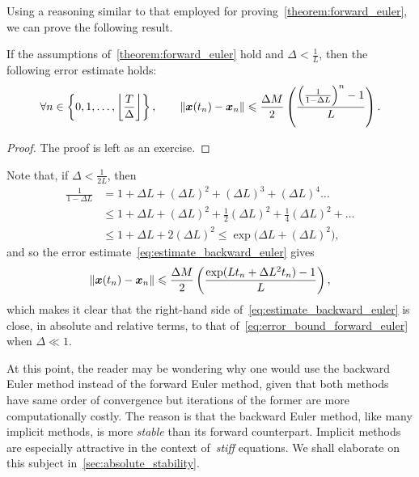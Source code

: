 Using a reasoning similar to that employed for proving~\cref{theorem:forward_euler},
we can prove the following result.
\begin{theorem}
    If the assumptions of~\cref{theorem:forward_euler} hold and $\Delta < \frac{1}{L}$,
    then the following error estimate holds:
    \begin{equation}
        \label{eq:estimate_backward_euler}
        \forall n \in \left\{0, 1, \dotsc, \floor*{\frac{T}{\Delta}} \right\},
        \qquad
        \vecnorm{\vect x(t_n) - \vect x_n}
        \leq
        \frac{\Delta M}{2} \left( \frac{\left( \frac{1}{1 - \Delta L} \right)^n - 1}{L} \right).
    \end{equation}
\end{theorem}
\begin{proof}
    The proof is left as an exercise.
\end{proof}
\begin{remark}
    Note that, if $\Delta < \frac{1}{2L}$,
    then
    \begin{align*}
         \frac{1}{1 - \Delta L}
         &= 1 + \Delta L + (\Delta L)^2 + (\Delta L)^3 + (\Delta L)^4 \dotsc \\
         &\leq 1 + \Delta L + (\Delta L)^2 + \frac{1}{2} (\Delta L)^2 + \frac{1}{4} (\Delta L)^2 + \dotsc \\
         &\leq 1 + \Delta L + 2 (\Delta L)^2 \leq \exp\bigl(\Delta L + (\Delta L)^2\bigr),
     \end{align*}
     and so the error estimate~\eqref{eq:estimate_backward_euler} gives
     \[
        \lVert\mathbf{\boldsymbol{x}}(t_n) - \mathbf{\boldsymbol{x}}_n\rVert
        \leqslant
        \frac{\Delta M}{2} \left( \frac{\exp(L t_n + \Delta L^2 t_n) - 1}{L} \right),
     \]
     which makes it clear that the right-hand side of~\eqref{eq:estimate_backward_euler} is close,
     in absolute and relative terms, to that of~\eqref{eq:error_bound_forward_euler} when $\Delta \ll 1$.
\end{remark}
At this point, the reader may be wondering why one would use the backward Euler method instead of the forward Euler method,
given that both methods have same order of convergence but iterations of the former are more computationally costly.
The reason is that the backward Euler method,
like many implicit methods,
is more \emph{stable} than its forward counterpart.
Implicit methods are especially attractive in the context of~\emph{stiff} equations.
We shall elaborate on this subject in~\cref{sec:absolute_stability}.

